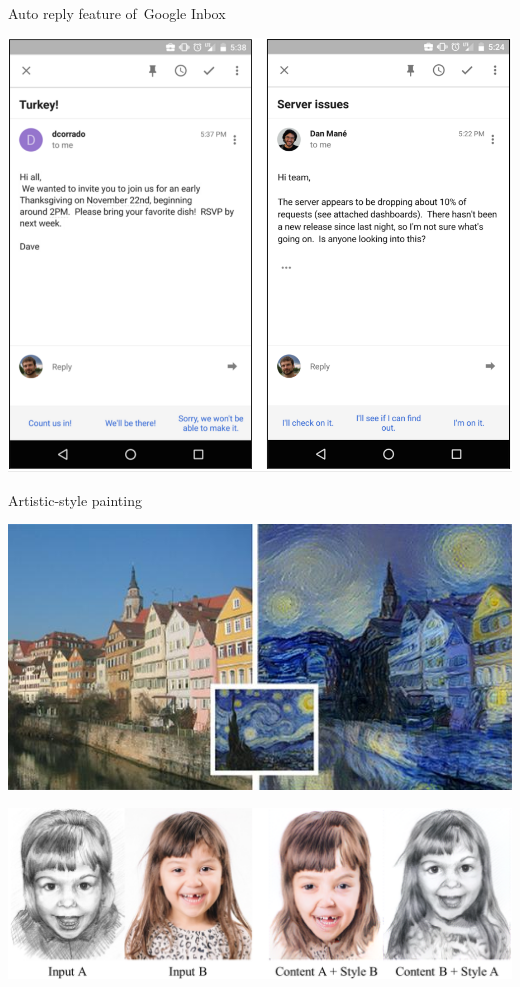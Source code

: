 \documentclass{beamer}
\begin{document}
  {
    \begin{frame}{Auto reply feature of~Google Inbox}
      \begin{center}
        \includegraphics[height=.85\textheight]{../img/Inbox_auto_reply.png}
      \end{center}
    \end{frame}
  }

  {
    \begin{frame}{Artistic-style painting}
      \begin{center}
        \includegraphics[height=.4\textheight]{../img/art_Van_Gogh.jpg}
        \pause

        \includegraphics[height=.44\textheight]{../img/art_girl.png}
      \end{center}
    \end{frame}
  }
\end{document}
